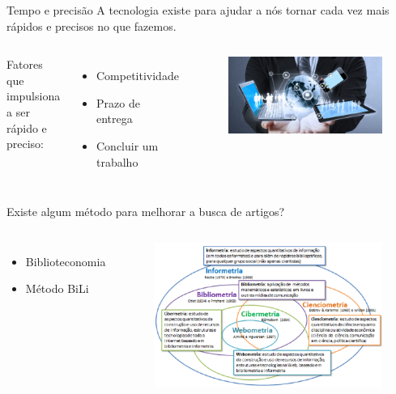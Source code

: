 \begin{frame}{Tempo e precisão}
	A tecnologia existe para ajudar a nós tornar cada vez mais rápidos e precisos no que fazemos. 

	\begin{columns}
		Fatores que impulsiona a ser rápido e preciso:
				\begin{itemize}
					\item Competitividade
					\item Prazo de entrega
					\item Concluir um trabalho 
				\end{itemize}
		\begin{figure}[hb]
			\includegraphics[width=1\textwidth]{figures/servicos.jpg}
		\end{figure}
	\end{columns}
\end{frame}

\begin{frame}{Existe algum método para melhorar a busca de artigos?}

	\begin{columns}
		\column{.3\textwidth}
		\begin{itemize}
			\item Biblioteconomia
			\item Método BiLi
		\end{itemize}
		\column{.8\textwidth}
		\begin{figure}[hb]
			\includegraphics[width=1\textwidth]{figures/biblioeconomia.png}
		\end{figure}
	\end{columns}
\end{frame}

